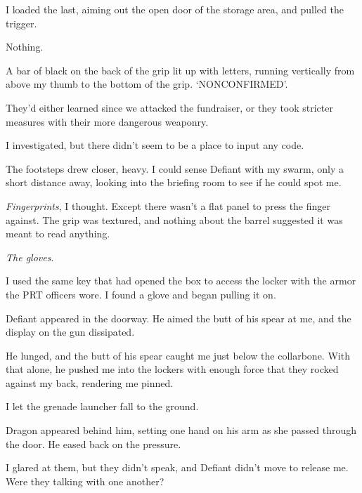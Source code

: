I loaded the last, aiming out the open door of the storage area, and pulled the trigger.



Nothing.



A bar of black on the back of the grip lit up with letters, running vertically from above my thumb to the bottom of the grip.  `NONCONFIRMED'.



They'd either learned since we attacked the fundraiser, or they took stricter measures with their more dangerous weaponry.



I investigated, but there didn't seem to be a place to input any code.



The footsteps drew closer, heavy.  I could sense Defiant with my swarm, only a short distance away, looking into the briefing room to see if he could spot me.



\emph{Fingerprints}, I thought.  Except there wasn't a flat panel to press the finger against.  The grip was textured, and nothing about the barrel suggested it was meant to read anything.



\emph{The gloves}.



I used the same key that had opened the box to access the locker with the armor the PRT officers wore.  I found a glove and began pulling it on.



Defiant appeared in the doorway.  He aimed the butt of his spear at me, and the display on the gun dissipated.



He lunged, and the butt of his spear caught me just below the collarbone.  With that alone, he pushed me into the lockers with enough force that they rocked against my back, rendering me pinned.



I let the grenade launcher fall to the ground.



Dragon appeared behind him, setting one hand on his arm as she passed through the door.  He eased back on the pressure.



I glared at them, but they didn't speak, and Defiant didn't move to release me.  Were they talking with one another?



